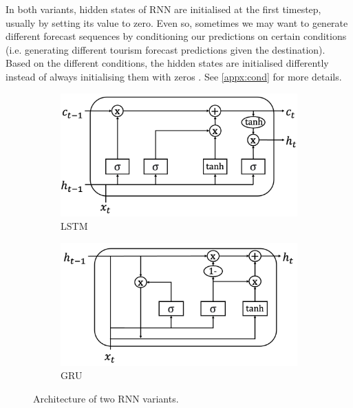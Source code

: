 \documentclass{article}
\begin{document}
In both variants, hidden states of RNN are initialised at the first timestep, usually by setting its value to zero. Even so, sometimes we may want to generate different forecast sequences by conditioning our predictions on certain conditions (i.e. generating different tourism forecast predictions given the destination). 
Based on the different conditions, the hidden states are initialised differently instead of always initialising them with zeros \cite{conditionrnn}. See \ref{appx:cond} for more details.

\begin{figure}[htbp]
     \centering
     \begin{subfigure}[b]{0.45\textwidth}
         \centering
         \includegraphics[width=.98\textwidth]{images/lstm.png}
         \caption{LSTM}
     \end{subfigure}
     \hfill
     \begin{subfigure}[b]{0.45\textwidth}
         \centering
         \includegraphics[width=\textwidth]{images/gru.png}
         \caption{GRU}
     \end{subfigure}
    \caption{Architecture of two RNN variants.}
    \label{fig:rnn}
\end{figure}
\end{document}
